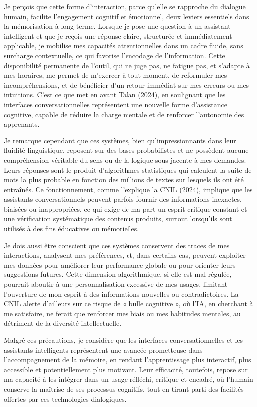 \documentclass[11pt,a4paper]{report}
\begin{document}
Je perçois que cette forme d’interaction, parce qu’elle se rapproche du dialogue humain, facilite l’engagement cognitif et émotionnel, deux leviers essentiels dans la mémorisation à long terme. Lorsque je pose une question à un assistant intelligent et que je reçois une réponse claire, structurée et immédiatement applicable, je mobilise mes capacités attentionnelles dans un cadre fluide, sans surcharge contextuelle, ce qui favorise l’encodage de l’information. Cette disponibilité permanente de l’outil, qui ne juge pas, ne fatigue pas, et s’adapte à mes horaires, me permet de m’exercer à tout moment, de reformuler mes incompréhensions, et de bénéficier d’un retour immédiat sur mes erreurs ou mes intuitions. C’est ce que met en avant Talan (2024), en soulignant que les interfaces conversationnelles représentent une nouvelle forme d’assistance cognitive, capable de réduire la charge mentale et de renforcer l’autonomie des apprenants.

Je remarque cependant que ces systèmes, bien qu’impressionnants dans leur fluidité linguistique, reposent sur des bases probabilistes et ne possèdent aucune compréhension véritable du sens ou de la logique sous-jacente à mes demandes. Leurs réponses sont le produit d’algorithmes statistiques qui calculent la suite de mots la plus probable en fonction des millions de textes sur lesquels ils ont été entraînés. Ce fonctionnement, comme l’explique la CNIL (2024), implique que les assistants conversationnels peuvent parfois fournir des informations inexactes, biaisées ou inappropriées, ce qui exige de ma part un esprit critique constant et une vérification systématique des contenus produits, surtout lorsqu’ils sont utilisés à des fins éducatives ou mémorielles.

Je dois aussi être conscient que ces systèmes conservent des traces de mes interactions, analysent mes préférences, et, dans certains cas, peuvent exploiter mes données pour améliorer leur performance globale ou pour orienter leurs suggestions futures. Cette dimension algorithmique, si elle est mal régulée, pourrait aboutir à une personnalisation excessive de mes usages, limitant l’ouverture de mon esprit à des informations nouvelles ou contradictoires. La CNIL alerte d’ailleurs sur ce risque de « bulle cognitive », où l’IA, en cherchant à me satisfaire, ne ferait que renforcer mes biais ou mes habitudes mentales, au détriment de la diversité intellectuelle.

Malgré ces précautions, je considère que les interfaces conversationnelles et les assistants intelligents représentent une avancée prometteuse dans l’accompagnement de la mémoire, en rendant l’apprentissage plus interactif, plus accessible et potentiellement plus motivant. Leur efficacité, toutefois, repose sur ma capacité à les intégrer dans un usage réfléchi, critique et encadré, où l’humain conserve la maîtrise de ses processus cognitifs, tout en tirant parti des facilités offertes par ces technologies dialogiques.
\end{document}

